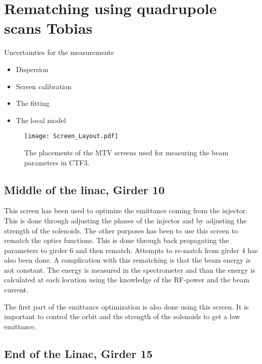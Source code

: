 \section{Rematching using quadrupole scans \textbf{Tobias}}

Uncertainties for the measurements
\begin{itemize}
\item Dispersion
\item Screen calibration
\item The fitting
\item The local model
\end{itemize}


\begin{figure}
\begin{center}
 \texttt{[image: Screen\_Layout.pdf]}
 \caption{The placements of the MTV screens used for measuring the beam parameters in CTF3. }
\label{fig:layout_screens}
\end{center}
\end{figure}

\subsection{Middle of the linac, Girder 10}
This screen has been used to optimize the emittance coming from the injector. 
This is done through adjusting the phases of the injector and by adjusting the strength of the solenoids. 
The other purposes has been to use this screen to rematch the optics functions. 
This is done through back propagating the parameters to girder 6 and then rematch. 
Attempts to re-match from girder 4 has also been done. 
A complication with this rematching is that the beam energy is not constant. 
The energy is measured in the spectrometer and than the energy is calculated at 
each location using the knowledge of the RF-power and the beam current. 

The first part of the emittance optimization is also done using this screen. 
It is important to control the orbit and the strength of the solenoids to get a low emittance. 



\subsection{End of the Linac, Girder 15}

